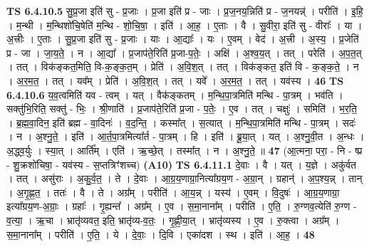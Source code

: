 \documentclass[17pt]{extarticle}
\begin{document}
                  \newline
                                \textbf{ TS 6.4.10.5} \newline
                  सु॒प्र॒जा इति॑ सु - प्र॒जाः । प्र॒जा इति॑ प्र - जाः । प्र॒ज॒नय॒न्निति॑ प्र - ज॒नयन्न्॑ । परीति॑ । इ॒हि॒ । म॒न्थी । म॒न्थिशो॑चि॒षेति॑ म॒न्थि - शो॒चि॒षा॒ । इति॑ । आ॒ह॒ । ए॒ताः । वै । सु॒वीरा॒ इति॑ सु - वीराः᳚ । या । अ॒त्त्रीः । ए॒ताः । सु॒प्र॒जा इति॑ सु - प्र॒जाः । याः । आ॒द्याः᳚ । यः । ए॒वम् । वेद॑ । अ॒त्त्री । अ॒स्य॒ । प्र॒जेति॑ प्र - जा । जा॒य॒ते॒ । न । आ॒द्या᳚ । प्र॒जाप॑ते॒रिति॑ प्र॒जा-प॒तेः॒ । अक्षि॑ । अ॒श्व॒य॒त् । तत् । परेति॑ । अ॒प॒त॒त् । तत् । विक॑ङ्कत॒मिति॒ वि-क॒ङ्क॒त॒म् । प्रेति॑ । अ॒वि॒श॒त् । तत् । विक॑ङ्कत॒ इति॑ वि - क॒ङ्क॒ते॒ । न । अ॒र॒म॒त॒ । तत् । यव᳚म् । प्रेति॑ । अ॒वि॒श॒त् । तत् । यवे᳚ । अ॒र॒म॒त॒ । तत् । यव॑स्य । \textbf{  46} \newline
                  \newline
                                \textbf{ TS 6.4.10.6} \newline
                  य॒व॒त्वमिति॑ यव - त्वम् । यत् । वैक॑ङ्कतम् । म॒न्थि॒पा॒त्रमिति॑ मन्थि - पा॒त्रम् । भव॑ति । सक्तु॑भि॒रिति॒ सक्तु॑ - भिः॒ । श्री॒णाति॑ । प्र॒जाप॑ते॒रिति॑ प्र॒जा - प॒तेः॒ । ए॒व । तत् । चक्षुः॑ । समिति॑ । भ॒र॒ति॒ । ब्र॒ह्म॒वा॒दिन॒ इति॑ ब्रह्म - वा॒दिनः॑ । व॒द॒न्ति॒ । कस्मा᳚त् । स॒त्यात् । म॒न्थि॒पा॒त्रमिति॑ मन्थि - पा॒त्रम् । सदः॑ । न । अ॒श्नु॒ते॒ । इति॑ । आ॒र्त॒पा॒त्रमित्या᳚र्त - पा॒त्रम् । हि । इति॑ । ब्रू॒या॒त् । यत् । अ॒श्नु॒वी॒त । अ॒न्धः । अ॒द्ध्व॒र्युः । स्या॒त् । आर्ति᳚म् । एति॑ । ऋ॒च्छे॒त् । तस्मा᳚त् । न । अ॒श्नु॒ते॒ ॥ \textbf{  47 } \newline
                  \newline
                      (आ॒त्मना॒ परा॒ - नि - ष्प्र - शु॒क्रशो॑चिषा॒ - यव॑स्य - स॒प्तत्रिꣳ॑शच्च)  \textbf{(A10)} \newline \newline
                                \textbf{ TS 6.4.11.1} \newline
                  दे॒वाः । वै । यत् । य॒ज्ञे । अकु॑र्वत । तत् । असु॑राः । अ॒कु॒र्व॒त॒ । ते । दे॒वाः । आ॒ग्र॒य॒णाग्रा॒नित्या᳚ग्रय॒ण - अ॒ग्रा॒न् । ग्रहान्॑ । अ॒प॒श्य॒न्न् । तान् । अ॒गृ॒ह्ण॒त॒ । ततः॑ । वै । ते । अग्र᳚म् । परीति॑ । आ॒य॒न्न् । यस्य॑ । ए॒वम् । वि॒दुषः॑ । आ॒ग्र॒य॒णाग्रा॒ इत्या᳚ग्रय॒ण-अ॒ग्राः॒ । ग्रहाः᳚ । गृ॒ह्यन्त᳚ । अग्र᳚म् । ए॒व । स॒मा॒नाना᳚म् । परीति॑ । ए॒ति॒ । रु॒ग्णव॒त्येति॑ रु॒ग्ण - व॒त्या॒ । ऋ॒चा । भ्रातृ॑व्यवत॒ इति॒ भ्रातृ॑व्य-व॒तः॒ । गृ॒ह्णी॒या॒त् । भ्रातृ॑व्यस्य । ए॒व । रु॒क्त्वा । अग्र᳚म् । स॒मा॒नाना᳚म् । परीति॑ । ए॒ति॒ । ये । दे॒वाः॒ । दि॒वि । एका॑दश । स्थ । इति॑ । आ॒ह॒ । \textbf{  48} \newline
\end{document}
